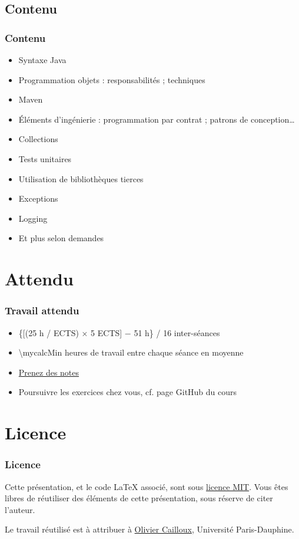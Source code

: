 \documentclass[english, french]{beamer}
\begin{document}
\subsection{Contenu}
\begin{frame}
	\frametitle{Contenu}
	\begin{itemize}
		\item Syntaxe Java
		\item Programmation objets : responsabilités ; techniques
		\item Maven
		\item Éléments d’ingénierie : programmation par contrat ; patrons de conception…
		\item Collections
		\item Tests unitaires
		\item Utilisation de bibliothèques tierces
		\item Exceptions
		\item Logging
		\item Et plus selon demandes
	\end{itemize}
\end{frame}

\section{Attendu}
\begin{frame}
	\frametitle{Travail attendu}
	\begin{itemize}
		\item \{[(25 h / ECTS) × 5 ECTS] − 51 h\} / 16 inter-séances
		\item \num[round-mode=places, round-precision=0, mode=text]{\mycalcMin} heures de travail entre chaque séance en moyenne
		\item \href{https://github.com/oliviercailloux/Teaching/blob/main/README.adoc\#take-notes}{Prenez des notes}
		\item Poursuivre les exercices chez vous, cf. page GitHub du cours
	\end{itemize}
\end{frame}

\appendix
\section{Licence}
\begin{frame}
	\frametitle{Licence}
	Cette présentation, et le code LaTeX associé, sont sous \href{https://opensource.org/licenses/MIT}{licence MIT}. Vous êtes libres de réutiliser des éléments de cette présentation, sous réserve de citer l’auteur.
	
	Le travail réutilisé est à attribuer à \href{https://www.lamsade.dauphine.fr/~ocailloux/}{Olivier Cailloux}, Université Paris-Dauphine.
\end{frame}
\end{document}
